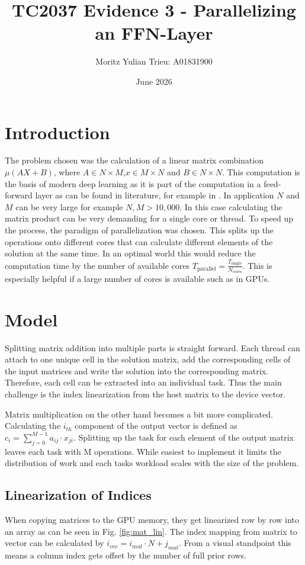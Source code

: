 \documentclass{article}
\title{TC2037 Evidence 3 - Parallelizing an FFN-Layer}
\author{Moritz Yulian Trieu: A01831900}
\date{June 2026}
\begin{document}
\maketitle

\section{Introduction}
The problem chosen was the calculation of a linear matrix combination $\mu(AX + B)$, where $A \in N \times M$,$x \in M \times N$ and $B \in N \times N$. This computation is the basis of modern deep learning as it is part of the computation in a feed-forward layer as can be found in literature, for example in \cite{Goodfellow-et-al-2016}. In application $N$ and $M$ can be very large for example $N, M > 10,000$. In this case calculating the matrix product can be very demanding for a single core or thread. To speed up the process, the paradigm of parallelization was chosen. This splits up the operations onto different cores that can calculate different elements of the solution at the same time. In an optimal world this would reduce the computation time by the number of available cores $T_{\text{parallel}} = \frac{T_{\text{single}}}{N_{\text{cores}}}$. This is especially helpful if a large number of cores is available such as in GPUs.

\section{Model}
Splitting matrix addition into multiple parts is straight forward. Each thread can attach to one unique cell in the solution matrix, add the corresponding cells of the input matrices and write the solution into the corresponding matrix. Therefore, each cell can be extracted into an individual task. Thus the main challenge is the index linearization from the host matrix to the device  vector.

Matrix multiplication on the other hand becomes a bit more complicated. Calculating the $i_{th}$ component of the output vector is defined as $c_i = \sum_{j=0}^{M-1} a_{ij} \cdot x_{ji}$. Splitting up the task for each element of the output matrix leaves each task with M operations. While easiest to implement it limits the distribution of work and each tasks workload scales with the size of the problem. 

\subsection{Linearization of Indices}
When copying matrices to the GPU memory, they get linearized row by row into an array as can be seen in Fig. \ref{fig:mat_lin}. The index mapping from matrix to vector can be calculated by $i_{vec} = i_{mat}\cdot N + j_{mat}$. From a visual standpoint this means a column index gets offset by the number of full prior rows. 
\end{document}
